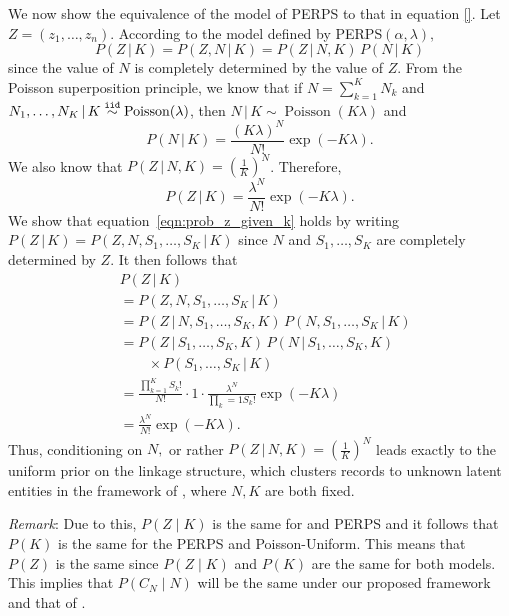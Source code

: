 \documentclass[twoside]{article}
\DeclareMathOperator*{\Poisson}{Poisson}
\newcommand{\g}{\,|\,}
\begin{document}
We now show the equivalence of the model of PERPS to that in equation \ref{}. 
Let $Z = (z_1, \ldots, z_n).$
According to the model defined by PERPS$(\alpha,\lambda),$ 
\begin{equation}
  P(Z \g K) = P(Z, N \g K) = P(Z \g N, K)\,P(N \g K)
  \end{equation}
since the value of $N$ is completely determined by the value of
$Z$. From the Poisson superposition principle, we know that if $N =
\sum_{k=1}^K N_k$ and $N_1, \ldots, N_K \g K \iid \Poisson(\lambda)$,
then $N \g K \sim \Poisson(K \lambda)$ and
\begin{equation}
  P(N \g K) = \frac{(K \lambda)^N}{N!} \exp{(-K \lambda)}.
  \end{equation}
We also know that $P(Z \g N, K) =
\left(\frac{1}{K}\right)^N$. Therefore,
\begin{equation}
  \label{eqn:prob_z_given_k}
  P(Z \g K) = \frac{\lambda^N}{N!} \exp{(-K \lambda)}.
  \end{equation}
We show that
equation~\ref{eqn:prob_z_given_k} holds by writing $P(Z \g K)
= P(Z, N, S_1, \ldots, S_K \g K)$ since $N$ and $S_1, \ldots, S_K$ are
completely determined by $Z$. It then follows that
\begin{align}
  &P(Z \g K) \\ &= P(Z, N, S_1, \ldots, S_K \g K)\\
  &= P(Z \g N, S_1, \ldots, S_K, K) \, P(N, S_1, \ldots, S_K \g K)\\
  &= P(Z \g S_1, \ldots, S_K, K)\, P(N \g S_1, \ldots, S_K, K) \, \\
  &\qquad \times
  P(S_1, \ldots, S_K \g K)\\
  &= \frac{\prod_{k=1}^K S_k!}{N!} \cdot 1 \cdot
  \frac{\lambda^N}{\prod_k=1 S_k!} \exp{(-K \lambda)}\\
  &= \frac{\lambda^N}{N!} \exp{(-K \lambda)}.
  \end{align}
Thus, conditioning on $N,$ or rather 
$P(Z \g N, K) = \left(\frac{1}{K}\right)^N$
leads exactly \cite{steorts??bayesian,steorts14smered} to the uniform prior on the linkage structure, which clusters records to unknown latent entities in the framework of \cite{steorts??bayesian,steorts14smered}, where $N, K$ are both fixed.

\emph{Remark}: Due to this, $P(Z \mid K)$ is the same for \cite{steorts??bayesian,steorts14smered} and PERPS and  it follows that $P(K)$ is the same for the PERPS and Poisson-Uniform.  This means that $P(Z)$ is the same since $P(Z\mid K)$ and $P(K)$ are the same for both models. This implies that $P(C_N \mid N)$ will be the same under our proposed framework and that of \cite{steorts??bayesian,steorts14smered}.



\clearpage
\newpage




\clearpage
\newpage

\appendix

\end{document}

